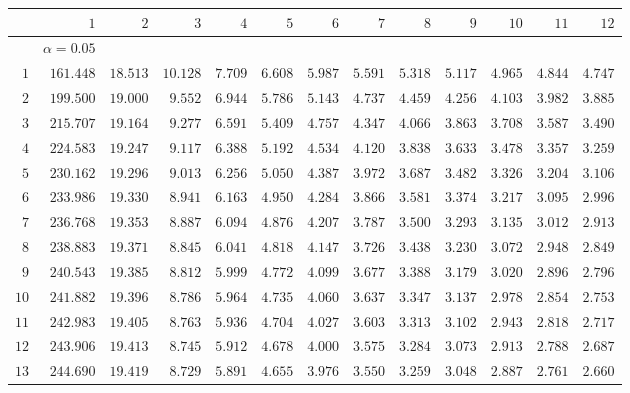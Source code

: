 \begin{tabular}{rrrrrrrrrrrrr}
  \hline
$\phantom{0}$ & $1$ & $2$ & $3$ & $4$ & $5$ & $6$ & $7$ & $8$ & $9$ & $10$ & $11$ & $12$ \\ 
  \hline
 & $\alpha = 0.05$ &  &  &  &  &  &  &  &  &  &  &  \\ 
  $1$ & $161.448$ & $18.513$ & $10.128$ & $7.709$ & $6.608$ & $5.987$ & $5.591$ & $5.318$ & $5.117$ & $4.965$ & $4.844$ & $4.747$ \\ 
  $2$ & $199.500$ & $19.000$ & $9.552$ & $6.944$ & $5.786$ & $5.143$ & $4.737$ & $4.459$ & $4.256$ & $4.103$ & $3.982$ & $3.885$ \\ 
  $3$ & $215.707$ & $19.164$ & $9.277$ & $6.591$ & $5.409$ & $4.757$ & $4.347$ & $4.066$ & $3.863$ & $3.708$ & $3.587$ & $3.490$ \\ 
  $4$ & $224.583$ & $19.247$ & $9.117$ & $6.388$ & $5.192$ & $4.534$ & $4.120$ & $3.838$ & $3.633$ & $3.478$ & $3.357$ & $3.259$ \\ 
  $5$ & $230.162$ & $19.296$ & $9.013$ & $6.256$ & $5.050$ & $4.387$ & $3.972$ & $3.687$ & $3.482$ & $3.326$ & $3.204$ & $3.106$ \\ 
  $6$ & $233.986$ & $19.330$ & $8.941$ & $6.163$ & $4.950$ & $4.284$ & $3.866$ & $3.581$ & $3.374$ & $3.217$ & $3.095$ & $2.996$ \\ 
  $7$ & $236.768$ & $19.353$ & $8.887$ & $6.094$ & $4.876$ & $4.207$ & $3.787$ & $3.500$ & $3.293$ & $3.135$ & $3.012$ & $2.913$ \\ 
  $8$ & $238.883$ & $19.371$ & $8.845$ & $6.041$ & $4.818$ & $4.147$ & $3.726$ & $3.438$ & $3.230$ & $3.072$ & $2.948$ & $2.849$ \\ 
  $9$ & $240.543$ & $19.385$ & $8.812$ & $5.999$ & $4.772$ & $4.099$ & $3.677$ & $3.388$ & $3.179$ & $3.020$ & $2.896$ & $2.796$ \\ 
  $10$ & $241.882$ & $19.396$ & $8.786$ & $5.964$ & $4.735$ & $4.060$ & $3.637$ & $3.347$ & $3.137$ & $2.978$ & $2.854$ & $2.753$ \\ 
  $11$ & $242.983$ & $19.405$ & $8.763$ & $5.936$ & $4.704$ & $4.027$ & $3.603$ & $3.313$ & $3.102$ & $2.943$ & $2.818$ & $2.717$ \\ 
  $12$ & $243.906$ & $19.413$ & $8.745$ & $5.912$ & $4.678$ & $4.000$ & $3.575$ & $3.284$ & $3.073$ & $2.913$ & $2.788$ & $2.687$ \\ 
  $13$ & $244.690$ & $19.419$ & $8.729$ & $5.891$ & $4.655$ & $3.976$ & $3.550$ & $3.259$ & $3.048$ & $2.887$ & $2.761$ & $2.660$ \\ 

\end{tabular}
